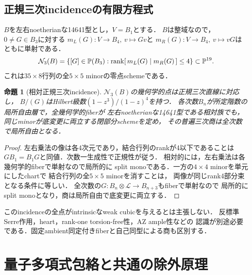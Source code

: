 \documentclass[11pt,a4paper]{ltjsarticle}
\newtheorem{proposition}[theorem]{命題}
\theoremstyle{definition}\newtheorem{definition}[theorem]{定義}
\newcommand{\rank}{\operatorname{rank}}\newcommand{\gldim}{\operatorname{gldim}}
\begin{document}
\subsection{正規三次incidenceの有限方程式}
$B$を左右noetherianな14641型とし，$V=B_1$とする．
$B$は整域なので，$0\ne G\in B_3$に対する
$m_L(G):V\to B_4,\ v\mapsto Gv$と
$m_R(G):V\to B_4,\ v\mapsto vG$はともに単射である．
\begin{equation}\label{eq:normal-cubic-determinantal}
 \mathcal N_3(B)=
 \{[G]\in\PP(B_3):\rank[\,m_L(G)\mid m_R(G)\,]\le4\}
 \subset\PP^{19}.
\end{equation}
これは$35\times8$行列の全$5\times5$ minorの零点schemeである．
\begin{proposition}[相対正規三次incidence]\label{prop:relative-normal-incidence}
$\mathcal N_3(B)$の幾何学的点は正規三次直線に対応し，
$B/(G)$はHilbert級数$(1-z^3)/(1-z)^4$を持つ．
各次数$B_n$が所定階数の局所自由層で，全幾何学的fiberが
左右noetherianな14641型である相対族でも，
同じminorが底変更に両立する閉部分schemeを定め，
その普遍三次商は全次数で局所自由となる．
\end{proposition}
\begin{proof}
左右乗法の像は各4次元であり，結合行列のrankが4以下であることは
$GB_1=B_1G$と同値．次数一生成性で正規性が従う．
相対的には，左右乗法は各幾何学的fiberで単射なので局所的に
split monoである．一方の$4\times4$ minorを単元にしたchartで
結合行列の全$5\times5$ minorを消すことは，
両像が同じrank4部分束となる条件に等しい．
全次数の$G:B_n\otimes\mathcal L\to B_{n+3}$もfiberで単射なので
局所的にsplit monoとなり，商は局所自由で底変更に両立する．
\end{proof}
このincidenceの全点がintrinsicなweak cubicを与えるとは主張しない．
反標準Serre作用，heart，rank-one torsion-free性，AZ ample性などの
認識が別途必要である．固定ambient同定付きfiberと自己同型による商も区別する．



\section{量子多項式包絡と共通の除外原理}
\end{document}
